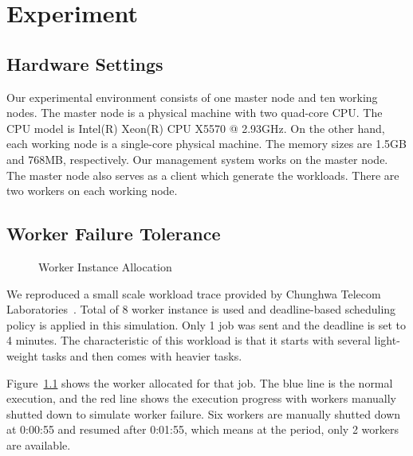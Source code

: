 \chapter{Experiment}\label{sec:exp}

\section{Hardware Settings}

Our experimental environment consists of one master node and ten working
nodes.
The master node is a physical machine with two quad-core CPU.
The CPU model is Intel(R) Xeon(R) CPU X5570 @ 2.93GHz.
On the other hand, each working node is a single-core physical machine.
The memory sizes are 1.5GB and 768MB, respectively.
Our management system works on the master node.
The master node also serves as a client which generate the workloads.
There are two workers on each working node.

\section{Worker Failure Tolerance}

\begin{figure}
  \caption{Worker Instance Allocation}
  \label{figure:worker-failure}
\end{figure}

We reproduced a small scale workload trace provided by Chunghwa Telecom
Laboratories~\cite{cite:cht-lab}.
Total of 8 worker instance is used and deadline-based scheduling policy
is applied in this simulation.
Only 1 job was sent and the deadline is set to 4 minutes.
The characteristic of this workload is that it starts with several
light-weight tasks and then comes with heavier tasks.

Figure~\ref{figure:worker-failure} shows the worker allocated for that
job.
The blue line is the normal execution, and the red line shows the
execution progress with workers manually shutted down to simulate worker
failure.
Six workers are manually shutted down at 0:00:55 and resumed after
0:01:55, which means at the period, only 2 workers are available.

